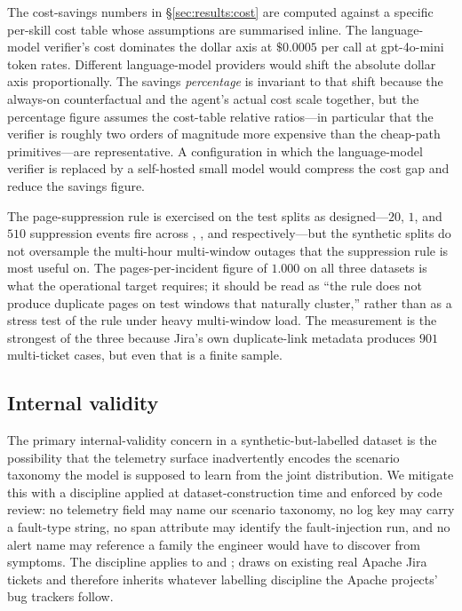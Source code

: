  The cost-savings numbers in \S\ref{sec:results:cost} are computed against a specific per-skill cost table whose assumptions are summarised inline. The language-model verifier's cost dominates the dollar axis at $\$0.0005$ per call at gpt-4o-mini token rates. Different language-model providers would shift the absolute dollar axis proportionally. The savings \emph{percentage} is invariant to that shift because the always-on counterfactual and the agent's actual cost scale together, but the percentage figure assumes the cost-table relative ratios---in particular that the verifier is roughly two orders of magnitude more expensive than the cheap-path primitives---are representative. A configuration in which the language-model verifier is replaced by a self-hosted small model would compress the cost gap and reduce the savings figure.

 The page-suppression rule is exercised on the test splits as designed---$20$, $1$, and $510$ suppression events fire across \dsob{}, \dsotel{}, and \dswol{} respectively---but the synthetic splits do not oversample the multi-hour multi-window outages that the suppression rule is most useful on. The pages-per-incident figure of $1.000$ on all three datasets is what the operational target requires; it should be read as ``the rule does not produce duplicate pages on test windows that naturally cluster,'' rather than as a stress test of the rule under heavy multi-window load. The \dswol{} measurement is the strongest of the three because Jira's own duplicate-link metadata produces $901$ multi-ticket cases, but even that is a finite sample.

\subsection{Internal validity}
\label{sec:threats:internal}

 The primary internal-validity concern in a synthetic-but-labelled dataset is the possibility that the telemetry surface inadvertently encodes the scenario taxonomy the model is supposed to learn from the joint distribution. We mitigate this with a discipline applied at dataset-construction time and enforced by code review: no telemetry field may name our scenario taxonomy, no log key may carry a fault-type string, no span attribute may identify the fault-injection run, and no alert name may reference a family the engineer would have to discover from symptoms. The discipline applies to \dsob{} and \dsotel{}; \dswol{} draws on existing real Apache Jira tickets and therefore inherits whatever labelling discipline the Apache projects' bug trackers follow.

